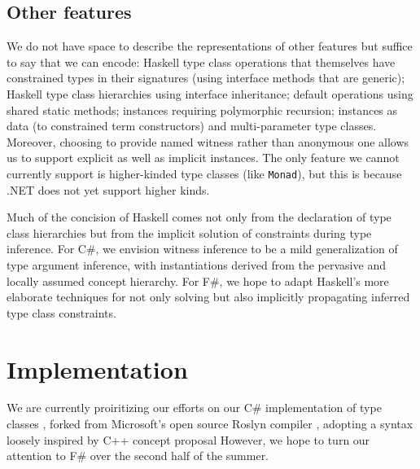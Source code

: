 \documentclass[preprint]{sig-alternate-05-2015}
\begin{document}
\subsection{Other features}

We do not have space to describe the representations of other features but suffice to say that we can encode:
Haskell type class operations that themselves have constrained types in their signatures (using interface methods that are generic);
Haskell type class hierarchies  using interface inheritance; default operations using shared static methods; instances requiring 
polymorphic recursion; instances as data (to constrained term constructors) and multi-parameter type classes. Moreover, choosing to provide named witness rather than anonymous one allows us to support
explicit as well as implicit instances.
The only feature we cannot currently support is higher-kinded type classes (like \lstinline{Monad}), but this is because .NET does not yet support higher kinds.

Much of the concision of Haskell comes not only from the declaration of type class hierarchies but from the implicit solution of constraints during type inference.
For C\#, we envision witness inference to be a mild generalization of type argument inference, with instantiations derived from the pervasive and locally assumed concept hierarchy.
For F\#, we hope to adapt Haskell's more elaborate techniques for not only solving but also implicitly propagating inferred type class constraints.
\section{Implementation}

We are currently proiritizing our efforts on our C\# implementation of type classes \cite{Roslynfork}, forked from Microsoft's open source Roslyn compiler \cite{Roslyn}, adopting a syntax loosely inspired by C++ concept proposal 
However, we hope to turn our attention to F\# over the second half of the summer.


 
\end{document}
